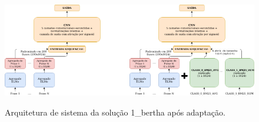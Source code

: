 \begin{figure}[h]
    \centering
    \caption{Arquitetura de sistema da solução 1\_bertha após adaptação.}
    \begin{center}
        \begin{overprint}
            \centering\includegraphics[width=0.50\textwidth]{img/1-bertha-arquitetura-sem-ri-corrigida.png}\centering\includegraphics[width=0.50\textwidth]{img/1-bertha-arquitetura-com-ri-corrigida.png}
        \end{overprint}
    \end{center}
    \vspace{-0.0cm}
    \label{fig:1-bertha-arquitetura-com-ri}
\end{figure}